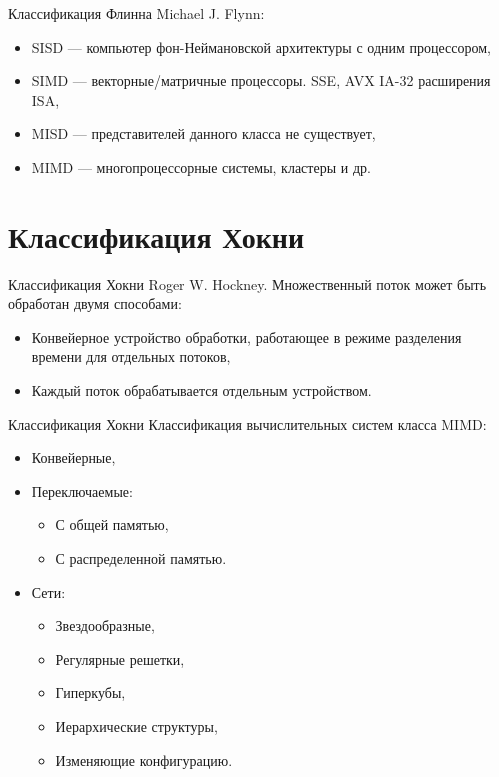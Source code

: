 \begin{frame}{Классификация Флинна}
Michael J. Flynn:
\vfill
\begin{itemize}
    \item SISD --- компьютер фон-Неймановской архитектуры с одним процессором,
    \item SIMD --- векторные/матричные процессоры. SSE, AVX IA-32 расширения ISA,
    \item MISD --- представителей данного класса не существует,
    \item MIMD --- многопроцессорные системы, кластеры и др.
\end{itemize}
\end{frame}

\section{Классификация Хокни}

\begin{frame}{Классификация Хокни}
Roger W. Hockney.
\vfill
Множественный поток может быть обработан двумя способами:
\begin{itemize}
    \item Конвейерное устройство обработки, работающее в режиме разделения
    времени для отдельных потоков,
    \item Каждый поток обрабатывается отдельным устройством.
\end{itemize}
\end{frame}

\begin{frame}{Классификация Хокни}
Классификация вычислительных систем класса MIMD:
\vfill
\begin{itemize}
    \item Конвейерные,
    \item Переключаемые:
    \begin{itemize}
        \item С общей памятью,
        \item С распределенной памятью.
    \end{itemize}
    \item Сети:
    \begin{itemize}
        \item Звездообразные,
        \item Регулярные решетки,
        \item Гиперкубы,
        \item Иерархические структуры,
        \item Изменяющие конфигурацию.
    \end{itemize}
\end{itemize}
\end{frame}


